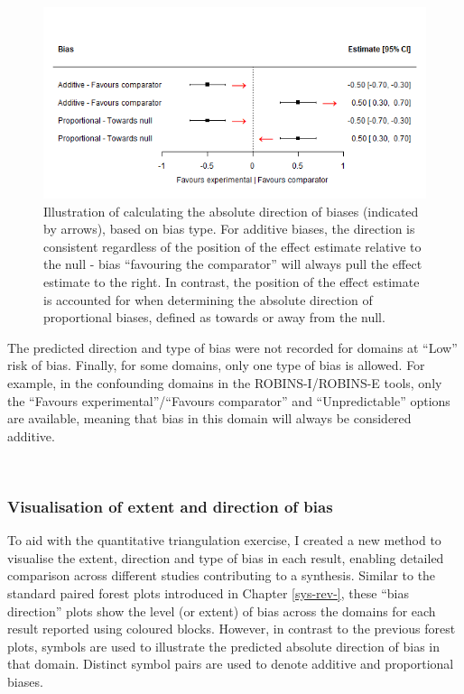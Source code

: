 \documentclass[a4paper, twoside]{templates/ociamthesis}
\begin{document}
\begin{figure}[H]
\includegraphics[width=1\linewidth]{figures/tri/exampleDirection} \caption[Illustration of calculating the absolute direction of biases, based on bias type.]{Illustration of calculating the absolute direction of biases (indicated by arrows), based on bias type. For additive biases, the direction is consistent regardless of the position of the effect estimate relative to the null - bias ``favouring the comparator'' will always pull the effect estimate to the right. In contrast, the position of the effect estimate is accounted for when determining the absolute direction of proportional biases, defined as towards or away from the null.}\label{fig:exampleDirection}
\end{figure}

The predicted direction and type of bias were not recorded for domains at ``Low'' risk of bias. Finally, for some domains, only one type of bias is allowed. For example, in the confounding domains in the ROBINS-I/ROBINS-E tools, only the ``Favours experimental''/``Favours comparator'' and ``Unpredictable'' options are available, meaning that bias in this domain will always be considered additive.

~

\hypertarget{visualisation-of-extent-and-direction-of-bias}{%
\subsubsection{Visualisation of extent and direction of bias}\label{visualisation-of-extent-and-direction-of-bias}}

To aid with the quantitative triangulation exercise, I created a new method to visualise the extent, direction and type of bias in each result, enabling detailed comparison across different studies contributing to a synthesis. Similar to the standard paired forest plots introduced in Chapter \ref{sys-rev-}, these ``bias direction'' plots show the level (or extent) of bias across the domains for each result reported using coloured blocks. However, in contrast to the previous forest plots, symbols are used to illustrate the predicted absolute direction of bias in that domain. Distinct symbol pairs are used to denote additive and proportional biases.
\end{document}
